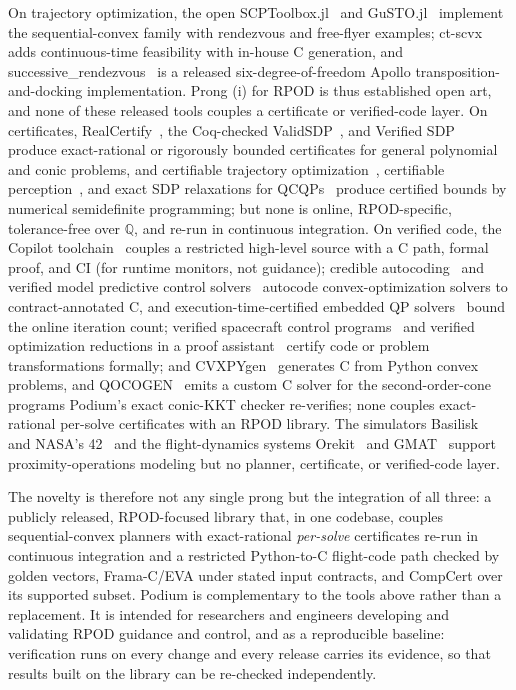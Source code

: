 \documentclass[11pt]{article}
\newcommand{\Q}{\mathbb{Q}}
\begin{document}
On trajectory optimization, the open SCPToolbox.jl~\cite{scptoolbox2022} and
GuSTO.jl~\cite{gusto2019} implement the sequential-convex family with
rendezvous and free-flyer examples; ct-scvx~\cite{elango2025} adds continuous-time
feasibility with in-house C generation, and successive\_rendezvous~\cite{successive_rendezvous2020} is a released six-degree-of-freedom Apollo transposition-and-docking
implementation. Prong (i) for RPOD is thus
established open art, and none of these released tools couples a certificate or verified-code
layer. On certificates, RealCertify~\cite{magron2018}, the Coq-checked ValidSDP~\cite{validsdp}, and Verified SDP~\cite{jansson2009} produce exact-rational or
rigorously bounded certificates for general polynomial and conic problems, and
certifiable trajectory optimization~\cite{strom2024}, certifiable perception~\cite{yang2023perception}, and exact SDP relaxations
for QCQPs~\cite{kojima2026,cifuentes2022} produce certified bounds by numerical
semidefinite programming; but none is online, RPOD-specific, tolerance-free over
$\Q$, and re-run in continuous integration. On verified code, the Copilot
toolchain~\cite{copilot2023} couples a restricted high-level source with a C
path, formal proof, and CI (for runtime monitors, not guidance); credible
autocoding~\cite{feron2013,cohen2020} and verified model predictive control
solvers~\cite{davy2018} autocode convex-optimization solvers to
contract-annotated C, and execution-time-certified embedded QP solvers~\cite{eiqp2025} bound the online iteration count; verified spacecraft control
programs~\cite{mokhov2018} and
verified optimization reductions in a proof assistant~\cite{cvxlean2024} certify
code or problem transformations formally; and CVXPYgen~\cite{cvxpygen2022}
generates C from Python convex problems, and QOCOGEN~\cite{chari2026qoco} emits a
custom C solver for the second-order-cone programs Podium's exact conic-KKT checker
re-verifies; none couples exact-rational per-solve
certificates with an RPOD library. The simulators Basilisk~\cite{basilisk2020} and NASA's 42~\cite{nasa42} and the flight-dynamics systems
Orekit~\cite{orekit2010} and GMAT~\cite{gmat2020} support proximity-operations
modeling but no planner, certificate, or verified-code layer.

The novelty is therefore not any single prong but the integration of all three: a publicly
released, RPOD-focused library that, in one codebase, couples sequential-convex
planners with exact-rational \emph{per-solve} certificates re-run in continuous
integration and a restricted Python-to-C flight-code path checked by golden
vectors, Frama-C/EVA under stated input contracts, and CompCert over its
supported subset. Podium is complementary to the tools above rather than a
replacement. It is intended for researchers and engineers developing and
validating RPOD guidance and control, and as a reproducible baseline: verification
runs on every change and every release carries its evidence, so that results built
on the library can be re-checked independently.
\end{document}
